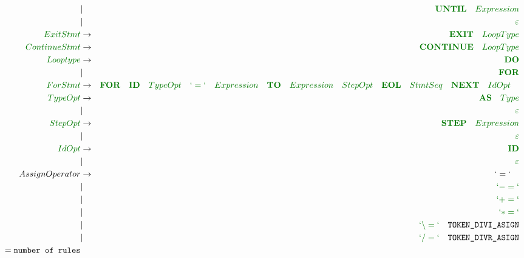 \documentclass[a4paper,11pt,landscape,leqno]{article}
\begin{document}
\begin{eqnarray}
&		|		& \textcolor{green1}{\textbf{UNTIL}\quad Expression} \\
&	|	&\textcolor{green1}{\varepsilon}  \\
\textcolor{green1}{ExitStmt} & \rightarrow & \textcolor{green1}{\textbf{EXIT}\quad LoopType}	\\
\textcolor{green1}{ContinueStmt} & \rightarrow & \textcolor{green1}{\textbf{CONTINUE}\quad LoopType}	\\
\textcolor{green1}{Looptype} & \rightarrow & \textcolor{green1}{\textbf{DO}}\\
&	|		&	\textcolor{green1}{\textbf{FOR}}   \\
\textcolor{green1}{ForStmt} &	 \rightarrow	&  \textcolor{green1}{\textbf{FOR}\quad \textbf{ID}\quad TypeOpt\quad `=`\quad Expression\quad \textbf{TO}\quad Expression\quad StepOpt\quad \textbf{EOL}\quad StmtSeq\quad \textbf{NEXT}\quad IdOpt\quad} \\
\textcolor{green1}{TypeOpt} & \rightarrow  & \textcolor{green1}{\textbf{AS}\quad Type} \\
& | &	\textcolor{green1}{\varepsilon} \\
\textcolor{green1}{StepOpt} & \rightarrow  & \textcolor{green1}{\textbf{STEP}\quad Expression} \\
& | &	\textcolor{green1}{\varepsilon} \\
\textcolor{green1}{IdOpt}	& \rightarrow & \textcolor{green1}{\textbf{ID}} \\
		& | &  \textcolor{green1}{\varepsilon} \\
AssignOperator	&	 \rightarrow	&	 `=` \quad		\\
		&	|		&	\textcolor{green1}{`-=`}	\\
		&	|		&	\textcolor{green1}{`+=`}	\\
		&	|		&	\textcolor{green1}{`*=`}	\\
		&	|		&	\textcolor{green1}{`\backslash =`}\quad \textrm{\texttt{TOKEN\_DIVI\_ASIGN}}	\\
		&	|		&	\textcolor{green1}{`/=`}\quad \textrm{\texttt{TOKEN\_DIVR\_ASIGN}}\\
 = \textrm{\texttt{number of rules}} & & 
\end{eqnarray}
\end{document}
